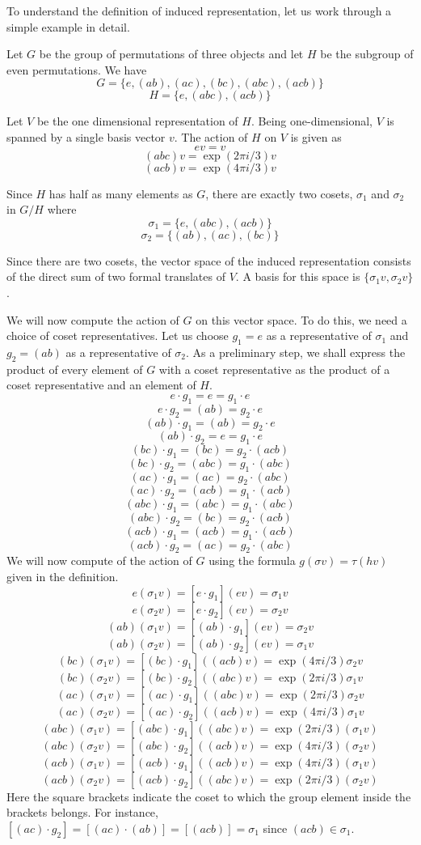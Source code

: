\documentclass[12pt]{article}
\begin{document}
To understand the definition of induced representation, let us work through a simple example in detail.

Let $G$ be the group of permutations of three objects and let $H$ be the  subgroup of even permutations.  We have
 $$G = \{ e, (ab), (ac), (bc), (abc), (acb) \}$$
 $$H = \{ e, (abc), (acb) \}$$

Let $V$ be the one dimensional representation of $H$.  Being one-dimensional, $V$ is spanned by a single basis vector $v$.  The action of $H$ on $V$ is given as
 $$e v = v$$
 $$(abc) v = \exp (2 \pi i / 3) v$$
 $$(acb) v = \exp (4 \pi i / 3) v$$

Since $H$ has half as many elements as $G$, there are exactly two cosets, $\sigma_1$ and $\sigma_2$ in $G/H$ where
 $$\sigma_1 = \{ e, (abc), (acb) \}$$
 $$\sigma_2 = \{ (ab), (ac), (bc) \}$$

Since there are two cosets, the vector space of the induced representation consists of the direct sum of two formal translates of $V$.  A basis for this space is $\{ \sigma_1 v, \sigma_2 v \}$.

We will now compute the action of $G$ on this vector space.  To do this, we need a choice of coset representatives.  Let us choose $g_1 = e$ as a representative of $\sigma_1$ and $g_2 = (ab)$ as a representative of $\sigma_2$.  As a preliminary step, we shall express the product of every element of $G$ with a coset representative as the product of a coset representative and an element of $H$.
 $$e \cdot g_1 = e =  g_1 \cdot e$$
 $$e \cdot g_2 = (ab) = g_2 \cdot e$$
 $$(ab) \cdot g_1 = (ab) = g_2 \cdot e$$
 $$(ab) \cdot g_2 = e = g_1 \cdot e$$
 $$(bc) \cdot g_1 = (bc) = g_2 \cdot (acb)$$
 $$(bc) \cdot g_2 = (abc) = g_1 \cdot (abc)$$
 $$(ac) \cdot g_1 = (ac) = g_2 \cdot (abc)$$
 $$(ac) \cdot g_2 = (acb) = g_1 \cdot (acb)$$
 $$(abc) \cdot g_1 = (abc) = g_1 \cdot (abc)$$
 $$(abc) \cdot g_2 = (bc) = g_2 \cdot (acb)$$
 $$(acb) \cdot g_1 = (acb) = g_1 \cdot (acb)$$
 $$(acb) \cdot g_2 = (ac) = g_2 \cdot (abc)$$
We will now compute of the action of $G$ using the formula $g(\sigma v) = \tau (hv)$ given in the definition.
 $$e (\sigma_1 v) = [e \cdot g_1] (e v) = \sigma_1 v$$
 $$e (\sigma_2 v) = [e \cdot g_2] (e v) = \sigma_2 v$$
 $$(ab) (\sigma_1 v) = [(ab) \cdot g_1] (e v) = \sigma_2 v$$
 $$(ab) (\sigma_2 v) = [(ab) \cdot g_2] (e v) = \sigma_1 v$$
 $$(bc) (\sigma_1 v) = [(bc) \cdot g_1] ((acb) v) = \exp(4 \pi i / 3) \sigma_2 v$$
 $$(bc) (\sigma_2 v) = [(bc) \cdot g_2] ((abc) v) = \exp(2 \pi i / 3) \sigma_1 v$$
 $$(ac) (\sigma_1 v) = [(ac) \cdot g_1] ((abc) v) = \exp(2 \pi i / 3) \sigma_2 v$$
 $$(ac) (\sigma_2 v) = [(ac) \cdot g_2] ((acb) v) = \exp(4 \pi i / 3) \sigma_1 v$$
 $$(abc) (\sigma_1 v) = [(abc) \cdot g_1] ((abc) v) = \exp(2 \pi i / 3) (\sigma_1 v)$$
 $$(abc) (\sigma_2 v) = [(abc) \cdot g_2] ((acb) v) = \exp(4 \pi i / 3) (\sigma_2 v)$$
 $$(acb) (\sigma_1 v) = [(acb) \cdot g_1] ((acb) v) = \exp(4 \pi i / 3) (\sigma_1 v)$$
 $$(acb) (\sigma_2 v) = [(acb) \cdot g_2] ((abc) v) = \exp(2 \pi i / 3) (\sigma_2 v)$$
Here the square brackets indicate the coset to which the group element inside the brackets belongs.  For instance, $[(ac) \cdot g_2] = [(ac) \cdot (ab)] = [(acb)] = \sigma_1$ since $(acb) \in \sigma_1$.
\end{document}
